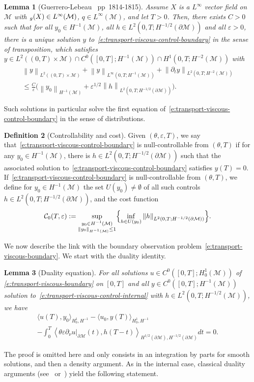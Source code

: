 \documentclass[10pt]{amsart}
\newtheorem{lemma}{Lemma}[section]
\theoremstyle{definition}
\newtheorem{definition}[lemma]{Definition}
\newcommand{\M}{\ensuremath{\mathcal M}}
\let \div \relax
\DeclareMathOperator{\div}{div}
\newcommand\nor[2]{\left\|#1\right\|_{#2}}
\let\d\partial
\let\eps\varepsilon
\begin{document}
\begin{lemma}[Guerrero-Lebeau~\cite{GL:07} pp~1814-1815]
Assume $X$ is a $L^\infty$ vector field on $\M$ with $\div_{g}(X) \in L^\infty(\M)$, $q \in L^\infty(\M)$, and let $T>0$. Then, there exists $C>0$ such that for all $y_0 \in H^{-1}(\M)$, all $h \in L^2(0,T ; H^{-1/2}(\d\M))$ and all $\eps>0$, there is a unique solution $y$ to~\eqref{e:transport-viscous-control-boundary} in the sense of transposition, which satisfies $y \in L^2((0,T)\times \M) \cap C^0([0,T]; H^{-1}(\M)) \cap H^1(0,T ; H^{-2}(\M))$ with
\begin{multline*}
\nor{y}{L^2((0,T)\times \M)} + \nor{y}{L^\infty(0,T; H^{-1}(\M))} + \nor{\d_t y}{L^2(0,T ; H^{-2}(\M))} \\
\leq \frac{C}{\eps} \bigl( \nor{y_0}{H^{-1}(\M)}+ \eps^{1/2} \nor{h}{L^2(0,T ; H^{-1/2}(\d\M))}\bigr).
\end{multline*}
\end{lemma}
Such solutions in particular solve the first equation of~\eqref{e:transport-viscous-control-boundary} in the sense of distributions.
\begin{definition}[Controllability and cost]
Given $(\theta, \eps, T)$, we say that~\eqref{e:transport-viscous-control-boundary} is null-controllable from $(\theta, T)$ if for any $y_0 \in H^{-1}(\M)$, there is $h \in L^2(0,T; H^{-1/2}(\d\M))$ such that the associated solution to~\eqref{e:transport-viscous-control-boundary} satisfies $y(T) =0$.
If~\eqref{e:transport-viscous-control-boundary} is null-controllable from $(\theta, T)$, we define for $y_0 \in H^{-1}(\M)$ the set $U(y_0) \neq \emptyset$ of all such controls $h \in L^2(0,T; H^{-1/2}(\d\M))$, and the cost function
\[
\mathcal{C}_0(T,\eps) := \sup_{\substack{y_0 \in H^{-1}(\M)\\ \nor{y_0}{H^{-1}(\M)}\leq 1}} \Bigl\{\inf_{h \in U(y_0)} \nor{h}{L^2(0,T; H^{-1/2}(\d\M))} \Bigr\}.
\]
\end{definition}

We now describe the link with the boundary observation problem~\eqref{e:transport-viscous-boundary}.
We start with the duality identity.
\begin{lemma}[Duality equation]
For all solutions $u \in C^0([0,T]; H^1_0(\M))$ of \eqref{e:transport-viscous-boundary} on $[0,T]$ and all $y\in C^0([0,T]; H^{-1}(\M))$ solution to~\eqref{e:transport-viscous-control-internal} with $h \in L^2(0,T; H^{-1/2}(\M))$, we have
\begin{multline*}
\langle u(T), y_0\rangle_{H^1_0, H^{-1}} - \langle u_0, y(T)\rangle_{H^1_0, H^{-1}} \\
- \int_0^T \left\langle \theta \eps \d_{\nu}u|_{\d\M}(t), h(T-t) \right\rangle_{H^{1/2}(\d\M),H^{-1/2}(\d\M)} dt =0.
\end{multline*}
\end{lemma}
The proof is omitted here and only consists in an integration by parts for smooth solutions, and then a density argument.
As in the internal case, classical duality arguments (see~\cite{DR:77} or~\cite[Chap.\,2.3]{Cor:book}) yield the following statement.
\end{document}

